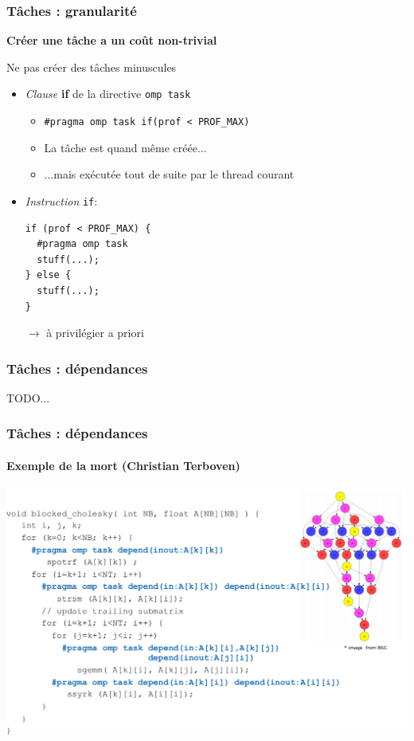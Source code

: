\documentclass{beamer}
\begin{document}
\begin{frame}[fragile]
  \frametitle{Tâches : granularité}

  \textbf{Créer une tâche a un coût non-trivial}

  \bigskip

  \begin{exampleblock}{Ne pas créer des tâches minuscules}
    \begin{itemize}
    \item \emph{Clause} \textbf{if} de la directive \texttt{omp task}
      \begin{itemize}
      \item \texttt{\#pragma omp task if(prof < PROF\_MAX)}
      \item La tâche est \alert{quand même créée}...
      \item ...mais exécutée tout de suite par le thread courant
      \end{itemize}

      \medskip

    \item \emph{Instruction} \texttt{if}:
\begin{verbatim}
if (prof < PROF_MAX) {
  #pragma omp task
  stuff(...);
} else {
  stuff(...);
}
\end{verbatim}
      \item[$\rightarrow$] à privilégier a priori
    \end{itemize}
  \end{exampleblock}
  
\end{frame}


\begin{frame}
  \frametitle{Tâches : dépendances}

  TODO...
\end{frame}


\begin{frame}
  \frametitle{Tâches : dépendances}
  \framesubtitle{Exemple de la mort (Christian Terboven)}
  
  \includegraphics[width=\textwidth]{block_cholesky_tasking}
  
\end{frame}
\end{document}
